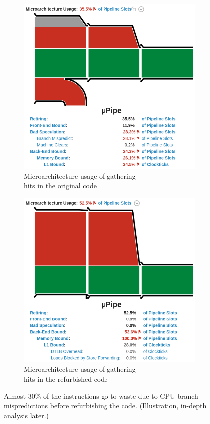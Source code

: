 \documentclass[12pt]{article}
\begin{document}
\begin{figure}[H]
	\centering
	\begin{subfigure}{.5\textwidth}
		\centering
		\includegraphics[width=.7\linewidth]{velout_gatherhits_orig_uarch}
		\caption{Microarchitecture usage of gathering\\ hits in the original code}
		\label{fig_velout_branch_example_sub1}
	\end{subfigure}%
	\begin{subfigure}{.5\textwidth}
		\centering
		\includegraphics[width=.7\linewidth]{velout_gatherhits_new_uarch}
		\caption{Microarchitecture usage of gathering\\ hits in the refurbished code}
		\label{fig_velout_branch_example_sub2}
	\end{subfigure}
	\caption{Almost 30\% of the instructions go to waste due to CPU branch mispredictions before refurbishing the code. (Illustration, in-depth analysis later.)}
	\label{fig_velout_branch_example}
\end{figure}
\end{document}
